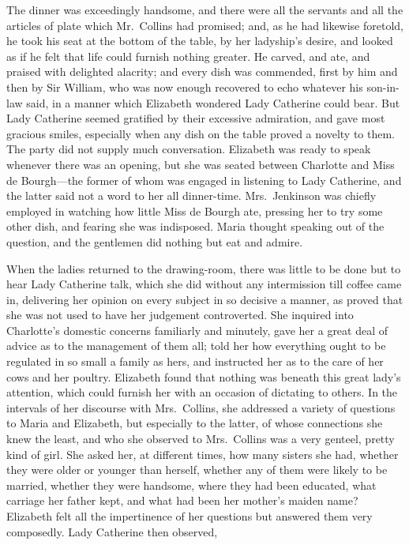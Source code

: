 \documentclass[12pt,english,oneside]{book}
\begin{document}
The dinner was exceedingly handsome, and there were all the servants
and all the articles of plate which Mr.\ Collins had promised; and,
as he had likewise foretold, he took his seat at the bottom of the
table, by her ladyship's desire, and looked as if he felt that life
could furnish nothing greater. He carved, and ate, and praised with
delighted alacrity; and every dish was commended, first by him and
then by Sir William, who was now enough recovered to echo whatever
his son-in-law said, in a manner which Elizabeth wondered Lady Catherine
could bear. But Lady Catherine seemed gratified by their excessive
admiration, and gave most gracious smiles, especially when any dish
on the table proved a novelty to them. The party did not supply much
conversation. Elizabeth was ready to speak whenever there was an opening,
but she was seated between Charlotte and Miss de Bourgh\mbox{---}the
former of whom was engaged in listening to Lady Catherine, and the
latter said not a word to her all dinner-time. Mrs.\ Jenkinson was
chiefly employed in watching how little Miss de Bourgh ate, pressing
her to try some other dish, and fearing she was indisposed. Maria
thought speaking out of the question, and the gentlemen did nothing
but eat and admire.

When the ladies returned to the drawing-room, there was little to
be done but to hear Lady Catherine talk, which she did without any
intermission till coffee came in, delivering her opinion on every
subject in so decisive a manner, as proved that she was not used to
have her judgement controverted. She inquired into Charlotte's domestic
concerns familiarly and minutely, gave her a great deal of advice
as to the management of them all; told her how everything ought to
be regulated in so small a family as hers, and instructed her as to
the care of her cows and her poultry. Elizabeth found that nothing
was beneath this great lady's attention, which could furnish her with
an occasion of dictating to others. In the intervals of her discourse
with Mrs.\ Collins, she addressed a variety of questions to Maria
and Elizabeth, but especially to the latter, of whose connections
she knew the least, and who she observed to Mrs.\ Collins was a very
genteel, pretty kind of girl. She asked her, at different times, how
many sisters she had, whether they were older or younger than herself,
whether any of them were likely to be married, whether they were handsome,
where they had been educated, what carriage her father kept, and what
had been her mother's maiden name? Elizabeth felt all the impertinence
of her questions but answered them very composedly. Lady Catherine
then observed,
\end{document}
